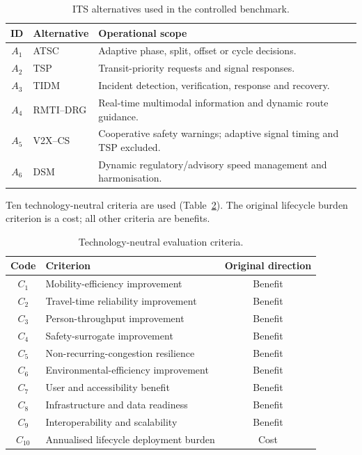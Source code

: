 \documentclass[runningheads]{llncs}
\begin{document}
\begin{table}[t]
\centering
\caption{ITS alternatives used in the controlled benchmark.}
\label{tab:alternatives}
\small
\begin{tabularx}{\linewidth}{@{}c l X@{}}
\toprule
\textbf{ID} & \textbf{Alternative} & \textbf{Operational scope}\\
\midrule
$A_1$ & ATSC & Adaptive phase, split, offset or cycle decisions.\\
$A_2$ & TSP & Transit-priority requests and signal responses.\\
$A_3$ & TIDM & Incident detection, verification, response and recovery.\\
$A_4$ & RMTI--DRG & Real-time multimodal information and dynamic route guidance.\\
$A_5$ & V2X--CS & Cooperative safety warnings; adaptive signal timing and TSP excluded.\\
$A_6$ & DSM & Dynamic regulatory/advisory speed management and harmonisation.\\
\bottomrule
\end{tabularx}
\end{table}

Ten technology-neutral criteria are used (Table~\ref{tab:criteria}). The original lifecycle
burden criterion is a cost; all other criteria are benefits.

\begin{table}[t]
\centering
\caption{Technology-neutral evaluation criteria.}
\label{tab:criteria}
\small
\begin{tabularx}{\linewidth}{@{}c X c@{}}
\toprule
\textbf{Code} & \textbf{Criterion} & \textbf{Original direction}\\
\midrule
$C_1$ & Mobility-efficiency improvement & Benefit\\
$C_2$ & Travel-time reliability improvement & Benefit\\
$C_3$ & Person-throughput improvement & Benefit\\
$C_4$ & Safety-surrogate improvement & Benefit\\
$C_5$ & Non-recurring-congestion resilience & Benefit\\
$C_6$ & Environmental-efficiency improvement & Benefit\\
$C_7$ & User and accessibility benefit & Benefit\\
$C_8$ & Infrastructure and data readiness & Benefit\\
$C_9$ & Interoperability and scalability & Benefit\\
$C_{10}$ & Annualised lifecycle deployment burden & Cost\\
\bottomrule
\end{tabularx}
\end{table}
\end{document}
